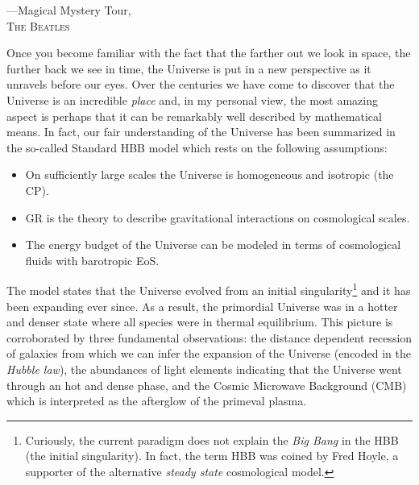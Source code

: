 \setlength{\epigraphwidth}{.35\textwidth}
\begin{epigraphs}
%
 {---Magical Mystery Tour,\\ \textsc{The Beatles}}
\end{epigraphs}

Once you become familiar with the fact that the farther out we look in space, the further back we see in time, the Universe is put in a new perspective as it unravels before our eyes. Over the centuries we have come to discover that the Universe is an incredible \emph{place} and, in my personal view, the most amazing aspect is perhaps that it can be remarkably
well described by mathematical means.
In fact, our fair understanding of the Universe has been summarized in the so-called Standard \gls{HBB} model which rests on the following assumptions:
%
\begin{itemize}
\item{On sufficiently large scales the Universe is homogeneous and isotropic (the \gls{CP}).}
\item{\gls{GR} is the theory to describe gravitational interactions on cosmological scales.}
\item{The energy budget of the Universe can be modeled in terms of cosmological fluids with barotropic \gls{EoS}.}
\end{itemize}
%
The model states that the Universe evolved from an initial singularity\footnote{Curiously, the current 
paradigm does not explain the \emph{Big Bang} in the \gls{HBB} (the initial singularity). In fact, the term \gls{HBB} was coined by Fred Hoyle, a supporter of the alternative \emph{steady state} cosmological model.} and it has been
expanding ever since. As a result, the primordial Universe was in a hotter and denser state where 
all species were in thermal equilibrium. This picture is corroborated by three 
fundamental observations: the distance dependent recession of galaxies from which we can infer the 
expansion of the Universe (encoded in the \emph{Hubble law}), the abundances of light elements 
indicating that the Universe went through an hot and dense phase, and the Cosmic Microwave Background (CMB) which is interpreted
as the afterglow of the primeval plasma. 

